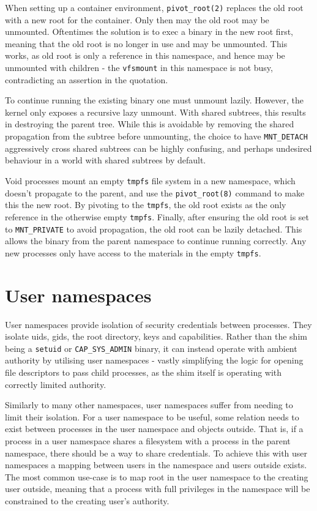 \documentclass[12pt,a4paper,twoside]{report}
\begin{document}
When setting up a container environment, \texttt{pivot\_root(2)} replaces the old root with a new root for the container. Only then may the old root may be unmounted. Oftentimes the solution is to exec a binary in the new root first, meaning that the old root is no longer in use and may be unmounted. This works, as old root is only a reference in this namespace, and hence may be unmounted with children - the \texttt{vfsmount} in this namespace is not busy, contradicting an assertion in the quotation.

To continue running the existing binary one must unmount lazily. However, the kernel only exposes a recursive lazy unmount. With shared subtrees, this results in destroying the parent tree. While this is avoidable by removing the shared propagation from the subtree before unmounting, the choice to have \texttt{MNT\_DETACH} aggressively cross shared subtrees can be highly confusing, and perhaps undesired behaviour in a world with shared subtrees by default.

Void processes mount an empty \texttt{tmpfs} file system in a new namespace, which doesn't propagate to the parent, and use the \texttt{pivot\_root(8)} command to make this the new root. By pivoting to the \texttt{tmpfs}, the old root exists as the only reference in the otherwise empty \texttt{tmpfs}. Finally, after ensuring the old root is set to \texttt{MNT\_PRIVATE} to avoid propagation, the old root can be lazily detached. This allows the binary from the parent namespace to continue running correctly. Any new processes only have access to the materials in the empty \texttt{tmpfs}.

\section{User namespaces}
\label{sec:voiding-user}

User namespaces provide isolation of security credentials between processes. They isolate uids, gids, the root directory, keys and capabilities. Rather than the shim being a \texttt{setuid} or \texttt{CAP\_SYS\_ADMIN} binary, it can instead operate with ambient authority by utilising user namespaces - vastly simplifying the logic for opening file descriptors to pass child processes, as the shim itself is operating with correctly limited authority.

Similarly to many other namespaces, user namespaces suffer from needing to limit their isolation. For a user namespace to be useful, some relation needs to exist between processes in the user namespace and objects outside. That is, if a process in a user namespace shares a filesystem with a process in the parent namespace, there should be a way to share credentials. To achieve this with user namespaces a mapping between users in the namespace and users outside exists. The most common use-case is to map root in the user namespace to the creating user outside, meaning that a process with full privileges in the namespace will be constrained to the creating user's authority.
\end{document}
